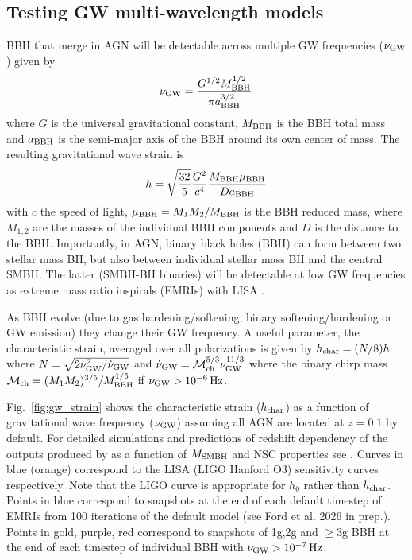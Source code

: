 \subsection{Testing GW multi-wavelength models}
\label{sec:gw}
BBH that merge in AGN will be detectable across multiple GW frequencies ($\nu_{\rm GW}$) given by
\begin{equation}
    \nu_{\rm GW} = \frac{G^{1/2}M_{\rm BBH}^{1/2}}{\pi a_{\rm BBH}^{3/2}}
\end{equation}
where $G$ is the universal gravitational constant, $M_{\rm BBH}$ is the BBH total mass and $a_{\rm BBH}$ is the semi-major axis of the BBH around its own center of mass. The resulting gravitational wave strain is
\begin{equation}
    h = \sqrt{\frac{32}{5}} \frac{G^{2}}{c^{4}}\frac{M_{\rm BBH}\mu_{\rm BBH}}{D a_{\rm BBH}}
\end{equation}
with $c$ the speed of light, $\mu_{\rm BBH}=M_{1}M_{2}/M_{\rm BBH}$ is the BBH reduced mass, where $M_{1,2}$ are the masses of the individual BBH components and $D$ is the distance to the BBH. Importantly, in AGN, binary black holes (BBH) can form between two stellar mass BH, but also between individual stellar mass BH and the central SMBH. The latter (SMBH-BH binaries) will be detectable at low GW frequencies as extreme mass ratio inspirals (EMRIs) with LISA \citep{LISA23}.

As BBH evolve (due to gas hardening/softening, binary softening/hardening or GW emission) they change their GW frequency. A useful parameter, the characteristic strain, averaged over all polarizations is
given by $h_{\rm char} = (N/8)h$ where $N = \sqrt{2\nu_{\rm GW}^{2}/\dot{\nu}_{\rm GW}}$ and $\dot{\nu}_{\rm GW}=\mathcal{M}_{\rm ch}^{5/3}\nu_{\rm GW}^{11/3}$ where the binary chirp mass $\mathcal{M}_{\rm ch}=(M_{1}M_{2})^{3/5}/M_{\rm BBH}^{1/5}$ if $\nu_{\rm GW}>10^{-6}\,{\rm Hz}$. 

Fig.~\ref{fig:gw_strain} shows the characteristic strain  ($h_{\rm char}$) as a function of gravitational wave frequency ($\nu_{\rm GW}$) assuming all AGN are located at $z=0.1$ by default. For detailed simulations and predictions of redshift dependency of the outputs produced by  as a function of $M_{\rm SMBH}$ and NSC properties see \citep{Delfavero+25}. Curves in blue (orange) correspond to the LISA (LIGO Hanford O3) sensitivity curves respectively. Note that the LIGO curve is appropriate for $h_{0}$ rather than $h_{\rm char}$. Points in blue correspond to snapshots at the end of each default timestep of EMRIs from 100 iterations of the default model (see Ford et al. 2026 in prep.). Points in gold, purple, red correspond to snapshots of 1g,2g and $\geq 3$g BBH at the end of each timestep of individual BBH with $\nu_{\rm GW}>10^{-7}\,{\rm Hz}$. 

